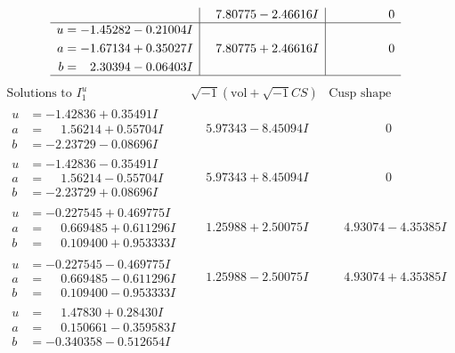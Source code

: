 \documentclass[1p]{elsarticle_modified}
\theoremstyle{definition}
\newcommand{\I}{\sqrt{-1}}
\begin{document}
$$\begin{array}{c|c|c}
 & \phantom{-}7.80775 - 2.46616 I & \phantom{-0.000000 } 0 \\ \hline\begin{aligned}
u &= -1.45282 - 0.21004 I \\
a &= -1.67134 + 0.35027 I \\
b &= \phantom{-}2.30394 - 0.06403 I\end{aligned}
 & \phantom{-}7.80775 + 2.46616 I & \phantom{-0.000000 } 0\\
 \hline 
 \end{array}$$\newpage$$\begin{array}{c|c|c}  
\text{Solutions to }I^u_{1}& \I (\text{vol} + \sqrt{-1}CS) & \text{Cusp shape}\\
 \hline 
\begin{aligned}
u &= -1.42836 + 0.35491 I \\
a &= \phantom{-}1.56214 + 0.55704 I \\
b &= -2.23729 - 0.08696 I\end{aligned}
 & \phantom{-}5.97343 - 8.45094 I & \phantom{-0.000000 } 0 \\ \hline\begin{aligned}
u &= -1.42836 - 0.35491 I \\
a &= \phantom{-}1.56214 - 0.55704 I \\
b &= -2.23729 + 0.08696 I\end{aligned}
 & \phantom{-}5.97343 + 8.45094 I & \phantom{-0.000000 } 0 \\ \hline\begin{aligned}
u &= -0.227545 + 0.469775 I \\
a &= \phantom{-}0.669485 + 0.611296 I \\
b &= \phantom{-}0.109400 + 0.953333 I\end{aligned}
 & \phantom{-}1.25988 + 2.50075 I & \phantom{-}4.93074 - 4.35385 I \\ \hline\begin{aligned}
u &= -0.227545 - 0.469775 I \\
a &= \phantom{-}0.669485 - 0.611296 I \\
b &= \phantom{-}0.109400 - 0.953333 I\end{aligned}
 & \phantom{-}1.25988 - 2.50075 I & \phantom{-}4.93074 + 4.35385 I \\ \hline\begin{aligned}
u &= \phantom{-}1.47830 + 0.28430 I \\
a &= \phantom{-}0.150661 - 0.359583 I \\
b &= -0.340358 - 0.512654 I\end{aligned}

\end{array}$$
\end{document}
